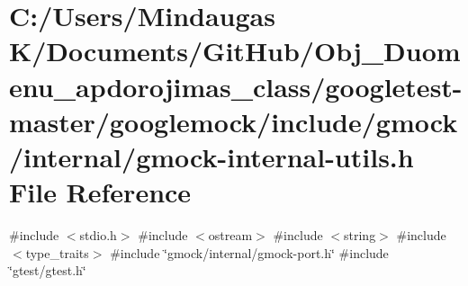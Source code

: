 \hypertarget{googletest-master_2googlemock_2include_2gmock_2internal_2gmock-internal-utils_8h}{}\section{C\+:/\+Users/\+Mindaugas K/\+Documents/\+Git\+Hub/\+Obj\+\_\+\+Duomenu\+\_\+apdorojimas\+\_\+class/googletest-\/master/googlemock/include/gmock/internal/gmock-\/internal-\/utils.h File Reference}
\label{googletest-master_2googlemock_2include_2gmock_2internal_2gmock-internal-utils_8h}
{\ttfamily \#include $<$stdio.\+h$>$}\newline
{\ttfamily \#include $<$ostream$>$}\newline
{\ttfamily \#include $<$string$>$}\newline
{\ttfamily \#include $<$type\+\_\+traits$>$}\newline
{\ttfamily \#include \char`\"{}gmock/internal/gmock-\/port.\+h\char`\"{}}\newline
{\ttfamily \#include \char`\"{}gtest/gtest.\+h\char`\"{}}\newline
